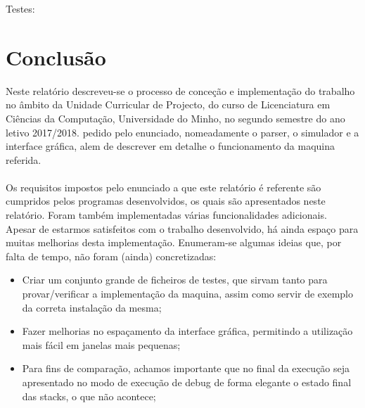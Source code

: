 \documentclass{report}
\begin{document}
Testes:

\noindent
\par
\begin{Parallel}[v]{0.48\textwidth}{0.48\textwidth}

\ParallelPar
\end{Parallel}

















\chapter{Conclusão} \label{concl}
\quad Neste relatório descreveu-se o processo de conceção e implementação do trabalho no
âmbito da Unidade Curricular de Projecto, do curso de Licenciatura em Ciências da Computação, Universidade do Minho, no
segundo semestre do ano letivo 2017/2018. pedido pelo
enunciado, nomeadamente o parser, o simulador e a interface gráfica, alem de descrever em detalhe
o funcionamento da maquina referida.\\\\
\null\quad Os requisitos impostos pelo enunciado a que este relatório é referente são cumpridos pelos programas desenvolvidos,
os quais são apresentados neste relatório. Foram também implementadas várias funcionalidades adicionais.\\
\null\quad Apesar de estarmos satisfeitos com o trabalho desenvolvido, há ainda espaço para muitas
melhorias desta implementação. Enumeram-se algumas ideias que, por falta de tempo, não foram
(ainda) concretizadas:

\begin{itemize}
\item Criar um conjunto grande de ficheiros de testes, que sirvam tanto para provar/verificar a
implementação da maquina, assim como servir de exemplo da correta instalação da mesma;
\item Fazer melhorias no espaçamento da interface gráfica, permitindo a utilização mais fácil em janelas mais pequenas;
\item Para fins de comparação, achamos importante que no final da execução seja apresentado no modo de execução de debug
 de forma elegante o estado final das stacks, o que não acontece;
\end{itemize}

%
%
\end{document}
